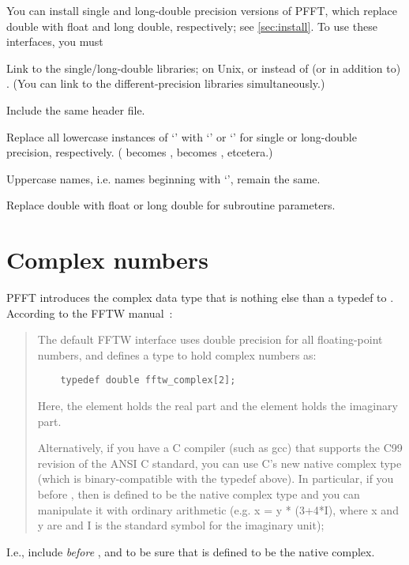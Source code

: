 You can install single and long-double precision versions of PFFT, which replace double with float and long double, respectively; see \ref{sec:install}.
To use these interfaces, you must
\begin{compactitem}
  \item Link to the single/long-double libraries; on Unix,  or  instead of (or in addition to) .
        (You can link to the different-precision libraries simultaneously.)
  \item Include the same  header file.
  \item Replace all lowercase instances of ‘’ with ‘’ or ‘’ for single or long-double precision, respectively.
        ( becomes ,  becomes , etcetera.)
  \item Uppercase names, i.e. names beginning with ‘’, remain the same.
  \item Replace double with float or long double for subroutine parameters.
\end{compactitem}

\section{Complex numbers}
PFFT introduces the complex data type  that is nothing else than a typedef to .
According to the FFTW manual~\cite{fftw-cplx-num}:
\begin{quote}
  The default FFTW interface uses double precision for all floating-point numbers, and defines a  type to hold complex numbers as:
  \begin{lstlisting}
    typedef double fftw_complex[2];
  \end{lstlisting}
  Here, the \code{[0]} element holds the real part and the \code{[1]} element holds the imaginary part.

  Alternatively, if you have a C compiler (such as gcc) that supports the C99 revision of the ANSI C standard,
  you can use C's new native complex type (which is binary-compatible with the typedef above).
  In particular, if you  before , then  is defined to be the native complex
  type and you can manipulate it with ordinary arithmetic (e.g. x = y * (3+4*I), where x and y are 
  and I is the standard symbol for the imaginary unit);
\end{quote}
I.e., include  \emph{before} ,  and  to be sure that  is defined to be the native complex.

